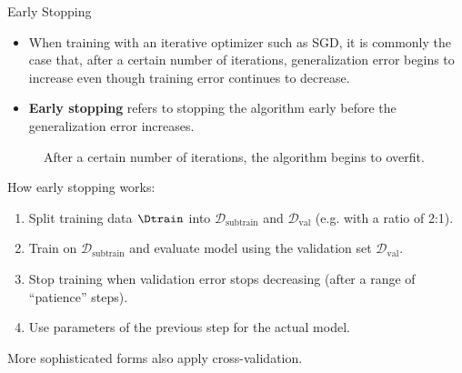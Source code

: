 \begin{vbframe}{Early Stopping}
  \begin{itemize}
    \item When training with an iterative optimizer such as SGD, it is commonly the case that, after a certain number of iterations, generalization error begins to increase even though training error continues to decrease.     
    \item \textbf{Early stopping} refers to stopping the algorithm early before the generalization error increases.
  \end{itemize}
  \begin{figure}
    \centering
      \caption{After a certain number of iterations, the algorithm begins to overfit.}
  \end{figure}
\framebreak
  How early stopping works:
  \begin{enumerate}
    \item Split training data $\Dtrain$ into $\mathcal{D}_{\text{subtrain}}$ and $\mathcal{D}_{\text{val}}$ (e.g. with a ratio of 2:1).
    \item Train on $\mathcal{D}_{\text{subtrain}}$ and evaluate model using the validation set $\mathcal{D}_{\text{val}}$.
    \item Stop training when validation error stops decreasing (after a range of \enquote{patience} steps).
    \item Use parameters of the previous step for the actual model.
  \end{enumerate}
  More sophisticated forms also apply cross-validation.
\end{vbframe}

